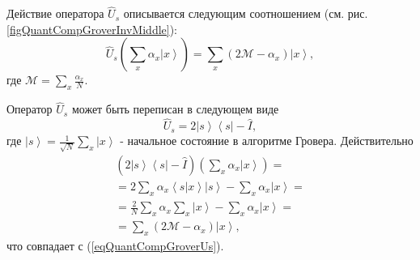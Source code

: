 

Действие оператора $\hat{U}_s$ описывается следующим соотношением
(см. рис. \ref{figQuantCompGroverInvMiddle}):
\begin{equation}
\hat{U}_s\left(\sum_x \alpha_x \left|x\right>\right) = 
\sum_x \left(2 \mathcal{M} - \alpha_x \right)\left|x\right>,
\label{eqQuantCompGroverUs}
\end{equation} 
где $\mathcal{M} = \sum_x \frac{\alpha_x}{N}$.

Оператор $\hat{U}_s$ может быть переписан в следующем виде
\begin{equation}
\hat{U}_s = 
2 \left|s\right>\left<s\right| - \hat{I},
\nonumber
\end{equation}
где $\left|s\right>=\frac{1}{\sqrt{N}}\sum_x \left|x\right>$ -
начальное состояние в алгоритме Гровера.
Действительно
\begin{eqnarray}
\left(2 \left|s\right>\left<s\right| - \hat{I}\right)
\left(\sum_x \alpha_x \left|x\right>\right) =
\nonumber \\
=  2 \sum_x \alpha_x \left<s\right.\left|x\right> \left|s\right> 
- \sum_x \alpha_x \left|x\right> = 
\nonumber \\
=
\frac{2}{N} \sum_x \alpha_x \sum_x \left|x\right> -
\sum_x \alpha_x \left|x\right> = 
\nonumber \\
= \sum_x \left( 2 \mathcal{M} -\alpha_x \right) \left|x\right>,
\nonumber
\end{eqnarray}
что совпадает с (\ref{eqQuantCompGroverUs}).




